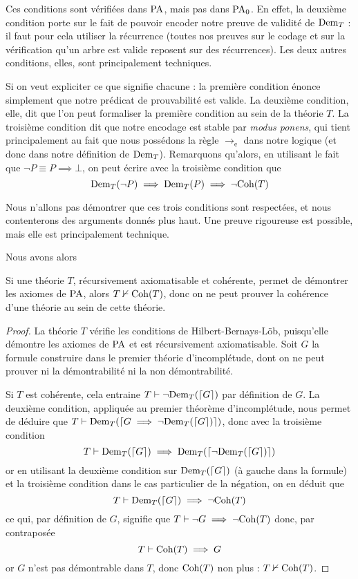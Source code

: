 Ces conditions sont vérifiées dans $\mathrm{PA}$, mais pas dans $\mathrm{PA}_0$. En effet, la deuxième condition porte sur le fait de pouvoir encoder notre preuve de \og validité\fg{} de $\mathrm{Dem}_T$ : il faut pour cela utiliser la récurrence (toutes nos preuves sur le codage et sur la vérification qu'un arbre est valide reposent sur des récurrences). Les deux autres conditions, elles, sont principalement techniques.

Si on veut expliciter ce que signifie chacune : la première condition énonce simplement que notre prédicat de prouvabilité est valide. La deuxième condition, elle, dit que l'on peut formaliser la première condition au sein de la théorie $T$. La troisième condition dit que notre encodage est stable par \textit{modus ponens}, qui tient principalement au fait que nous possédons la règle $\to_\mathrm e$ dans notre logique (et donc dans notre définition de $\mathrm{Dem}_T$). Remarquons qu'alors, en utilisant le fait que $\lnot P \equiv P\implies \bot$, on peut écrire avec la troisième condition que $$\mathrm{Dem}_T(\lnot P)\implies\mathrm{Dem}_T(P)\implies\lnot \mathrm{Coh}(T)$$

Nous n'allons pas démontrer que ces trois conditions sont respectées, et nous contenterons des arguments donnés plus haut. Une preuve rigoureuse est possible, mais elle est principalement technique.

Nous avons alors

\begin{them}
    Si une théorie $T$, récursivement axiomatisable et cohérente, permet de démontrer les axiomes de $\mathrm{PA}$, alors $T\nvdash \mathrm{Coh}(T)$, donc on ne peut prouver la cohérence d'une théorie au sein de cette théorie.
\end{them}

\begin{proof}
    La théorie $T$ vérifie les conditions de Hilbert-Bernays-Löb, puisqu'elle démontre les axiomes de $\mathrm{PA}$ et est récursivement axiomatisable. Soit $G$ la formule construire dans le premier théorie d'incomplétude, dont on ne peut prouver ni la démontrabilité ni la non démontrabilité.
    
    Si $T$ est cohérente, cela entraine $T\vdash \lnot\mathrm{Dem}_T(\lceil G \rceil)$ par définition de $G$. La deuxième condition, appliquée au premier théorème d'incomplétude, nous permet de déduire que $T\vdash \mathrm{Dem}_T(\lceil G\implies \lnot\mathrm{Dem}_T(\lceil G \rceil) \rceil)$, donc avec la troisième condition $$T\vdash \mathrm{Dem}_T(\lceil G \rceil)\implies \mathrm{Dem}_T(\lceil \lnot \mathrm{Dem}_T(\lceil G \rceil) \rceil)$$ or en utilisant la deuxième condition sur $\mathrm{Dem}_T(\lceil G \rceil)$ (à gauche dans la formule) et la troisième condition dans le cas particulier de la négation, on en déduit que $$T\vdash \mathrm{Dem}_T(\lceil G \rceil)\implies \lnot\mathrm{Coh}(T)$$ ce qui, par définition de $G$, signifie que $T\vdash \lnot G\implies \lnot\mathrm{Coh}(T)$ donc, par contraposée $$T\vdash \mathrm{Coh}(T)\implies G$$ or $G$ n'est pas démontrable dans $T$, donc $\mathrm{Coh}(T)$ non plus : $T\nvdash \mathrm{Coh}(T)$.
\end{proof}

